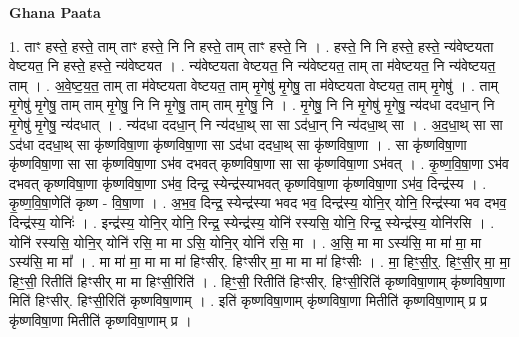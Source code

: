 \documentclass[17pt]{extarticle}
\begin{document}
\textbf{Ghana Paata } \newline

1. ताꣳ हस्ते॒ हस्ते॒ ताम् ताꣳ हस्ते॒ नि नि हस्ते॒ ताम् ताꣳ हस्ते॒ नि । . हस्ते॒ नि नि हस्ते॒ हस्ते॒ न्य॑वेष्टयता वेष्टयत॒ नि हस्ते॒ हस्ते॒ न्य॑वेष्टयत । . न्य॑वेष्टयता वेष्टयत॒ नि न्य॑वेष्टयत॒ ताम् ता म॑वेष्टयत॒ नि न्य॑वेष्टयत॒ ताम् । . अ॒वे॒ष्ट॒य॒त॒ ताम् ता म॑वेष्टयता वेष्टयत॒ ताम् मृ॒गेषु॑ मृ॒गेषु॒ ता म॑वेष्टयता वेष्टयत॒ ताम् मृ॒गेषु॑ । . ताम् मृ॒गेषु॑ मृ॒गेषु॒ ताम् ताम् मृ॒गेषु॒ नि नि मृ॒गेषु॒ ताम् ताम् मृ॒गेषु॒ नि । . मृ॒गेषु॒ नि नि मृ॒गेषु॑ मृ॒गेषु॒ न्य॑दधा ददधा॒न् नि मृ॒गेषु॑ मृ॒गेषु॒ न्य॑दधात् । . न्य॑दधा ददधा॒न् नि न्य॑दधा॒थ् सा सा ऽद॑धा॒न् नि न्य॑दधा॒थ् सा । . अ॒द॒धा॒थ् सा सा ऽद॑धा ददधा॒थ् सा कृ॑ष्णविषा॒णा कृ॑ष्णविषा॒णा सा ऽद॑धा ददधा॒थ् सा कृ॑ष्णविषा॒णा । . सा कृ॑ष्णविषा॒णा कृ॑ष्णविषा॒णा सा सा कृ॑ष्णविषा॒णा ऽभ॑व दभवत् कृष्णविषा॒णा सा सा कृ॑ष्णविषा॒णा ऽभ॑वत् । . कृ॒ष्ण॒वि॒षा॒णा ऽभ॑व दभवत् कृष्णविषा॒णा कृ॑ष्णविषा॒णा ऽभ॑व॒ दिन्द्र॒ स्येन्द्र॑स्याभवत् कृष्णविषा॒णा कृ॑ष्णविषा॒णा ऽभ॑व॒ दिन्द्र॑स्य । . कृ॒ष्ण॒वि॒षा॒णेति॑ कृष्ण - वि॒षा॒णा । . अ॒भ॒व॒ दिन्द्र॒ स्येन्द्र॑स्या भवद भव॒ दिन्द्र॑स्य॒ योनि॒र् योनि॒ रिन्द्र॑स्या भव दभव॒ दिन्द्र॑स्य॒ योनिः॑ । . इन्द्र॑स्य॒ योनि॒र् योनि॒ रिन्द्र॒ स्येन्द्र॑स्य॒ योनि॑ रस्यसि॒ योनि॒ रिन्द्र॒ स्येन्द्र॑स्य॒ योनि॑रसि । . योनि॑ रस्यसि॒ योनि॒र् योनि॑ रसि॒ मा मा ऽसि॒ योनि॒र् योनि॑ रसि॒ मा । . अ॒सि॒ मा मा ऽस्य॑सि॒ मा मा॑ मा॒ मा ऽस्य॑सि॒ मा मा᳚ । . मा मा॑ मा॒ मा मा मा॑ हिꣳसीर्. हिꣳसीर् मा॒ मा मा मा॑ हिꣳसीः । . मा॒ हिꣳ॒॒सी॒र्॒. हिꣳ॒॒सी॒र् मा॒ मा॒ हिꣳ॒॒सी॒ रितीति॑ हिꣳसीर् मा मा हिꣳसी॒रिति॑ । . हिꣳ॒॒सी॒ रितीति॑ हिꣳसीर्. हिꣳसी॒रिति॑ कृष्णविषा॒णाम् कृ॑ष्णविषा॒णा मिति॑ हिꣳसीर्. हिꣳसी॒रिति॑ कृष्णविषा॒णाम् । . इति॑ कृष्णविषा॒णाम् कृ॑ष्णविषा॒णा मितीति॑ कृष्णविषा॒णाम् प्र प्र कृ॑ष्णविषा॒णा मितीति॑ कृष्णविषा॒णाम् प्र । \newline
\end{document}
